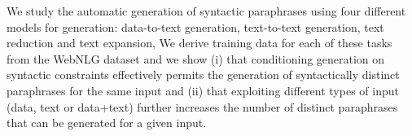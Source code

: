 We study the automatic generation of syntactic paraphrases using four different models for generation: data-to-text generation, text-to-text generation, text reduction and text expansion, We derive training data for each of these tasks from the WebNLG dataset and we show (i) that conditioning generation on syntactic constraints effectively permits the generation of syntactically distinct paraphrases for the same input and (ii) that exploiting different types of input (data, text or data+text) further increases the number of distinct paraphrases that can be generated for a given input.

